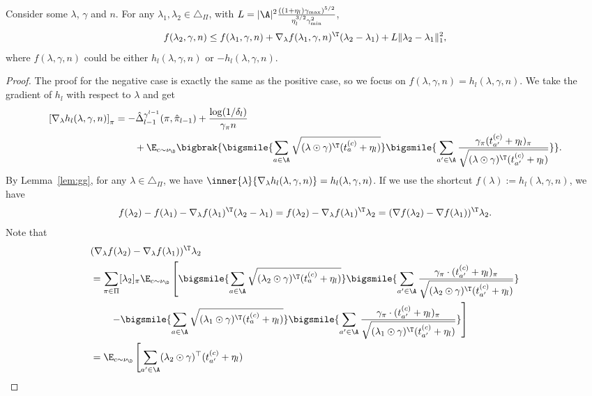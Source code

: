 \documentclass{article}
\newcommand{\1}{\mathbf{1}}
\begin{document}
\begin{lemma}\label{lem:f_Lipschitz}
Consider some $\lambda$, $\gamma$ and $n$. For any $\lambda_1,\lambda_2\in\triangle_\Pi$, with $L=|\A|^2\frac{((1+\eta_l)\gamma_{\max})^{5/2}}{\eta_l^{3/2}\gamma_{\min}^2}$,
\[f(\lambda_2,\gamma,n)\leq f(\lambda_1,\gamma,n)+\nabla_\lambda f(\lambda_1,\gamma,n)^\T (\lambda_2-\lambda_1)+L\|\lambda_2-\lambda_1\|_1^2,\]
where $f(\lambda,\gamma,n)$ could be either $h_l(\lambda,\gamma,n)$ or $-h_l(\lambda,\gamma,n)$.
\end{lemma}
\begin{proof}
The proof for the negative case is exactly the same as the positive case, so we focus on $f(\lambda,\gamma,n)=h_l(\lambda,\gamma,n)$. We take the gradient of $h_l$ with respect to $\lambda$ and get
\begin{align*}
    \left[\nabla_\lambda h_l(\lambda,\gamma,n)\right]_\pi&=-\hat{\Delta}_{l-1}^{\gamma^{l-1}}(\pi,\hat{\pi}_{l-1})+\frac{\log(1/\delta_l)}{\gamma_\pi n}\\
    &\qquad+\E_{c\sim\nu_\D}\bigbrak{\bigsmile{\sum_{a\in\A}\sqrt{(\lambda\odot \gamma)^\T (t_a^{(c)}+\eta_l)}}\bigsmile{\sum_{a'\in\A}\frac{\gamma_\pi(t_{a'}^{(c)}+\eta_l)_\pi}{\sqrt{(\lambda\odot \gamma)^\T (t_{a'}^{(c)}+\eta_l)}}}}.
\end{align*}
By Lemma~\ref{lem:gg}, for any $\lambda\in\triangle_\Pi$, we have $\inner{\lambda}{\nabla_{\lambda} h_l(\lambda,\gamma,n)}= h_l(\lambda,\gamma,n)$. If we use the shortcut $f(\lambda):=h_l(\lambda,\gamma,n)$, we have
\[ f(\lambda_2)-  f(\lambda_1)-\nabla_{\lambda} f(\lambda_1)^\T (\lambda_2-\lambda_1)= f(\lambda_2)-\nabla_{\lambda} f(\lambda_1)^\T\lambda_2=(\nabla f(\lambda_2)-\nabla f(\lambda_1))^\T\lambda_2.\] 
Note that
{
\small
\begin{align}
    &(\nabla_\lambda f(\lambda_2)-\nabla_\lambda f(\lambda_1))^\T\lambda_2\nonumber\\
    &=\sum_{\pi\in\Pi}[\lambda_2]_\pi\E_{c\sim\nu_\D}\left[\bigsmile{\sum_{a\in\A}\sqrt{(\lambda_2\odot\gamma)^\T(t_a^{(c)}+\eta_l)}}\bigsmile{\sum_{a'\in\A}\frac{\gamma_\pi\cdot(t_{a'}^{(c)}+\eta_l)_\pi}{\sqrt{(\lambda_2\odot\gamma)^\T(t_{a'}^{(c)}+\eta_l)}}}\right.\nonumber\\
    &\qquad\left.-\bigsmile{\sum_{a\in\A}\sqrt{(\lambda_1\odot\gamma)^\T(t_a^{(c)}+\eta_l)}}\bigsmile{\sum_{a'\in\A}\frac{\gamma_\pi\cdot(t_{a'}^{(c)}+\eta_l)_\pi}{\sqrt{(\lambda_1\odot\gamma)^\T(t_{a'}^{(c)}+\eta_l)}}}\right]\nonumber\\
    &= \E_{c\sim\nu_\D}\left[\sum_{a^{\prime} \in \A}(\lambda_{2}\odot\gamma)^{\top} (t_{a^{\prime}}^{(c)}+\eta_l)\right. \nonumber\\

\end{align}}
\end{proof}
\end{document}
